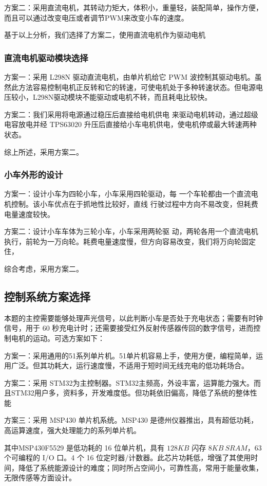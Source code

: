 \documentclass[UTF8]{ctexart}
\begin{document}
方案二：采用直流电机，其转动力矩大，体积小，重量轻，装配简单，操作方便，而且可以通过改变电压或者调节PWM来改变小车的速度。

基于以上分析，我们选择了方案二，使用直流电机作为驱动电机

\subsubsection{直流电机驱动模块选择}
方案一：采用 L298N 驱动直流电机，由单片机给它 PWM 波控制其驱动电机。虽然此方法容易控制电机正反转和它的转速，可使电机处于多种转速状态。但电源电压较小，L298N驱动模块不能驱动或电机不转，而且耗电比较快。 

方案二：我们采用将电源通过稳压后直接给电机供电 来驱动电机转动，通过超级电容放电并经 TPS63020 升压后直接给小车电机供电，使电机停或最大转速两种状态。

综上所述，采用方案二。

\subsubsection{小车外形的设计}

方案一：设计小车为四轮小车，小车采用四轮驱动，每 一个车轮都由一个直流电机控制。该小车优点在于抓地性比较好，直线 行驶过程中方向不易改变，但耗费电量速度较快。 

方案二：设计小车车体为三轮小车，小车采用两轮驱 动，两轮各用一个直流电机执行，前轮为一万向轮。耗费电量速度慢，但方向容易改变，我们将万向轮固定住，

综合考虑，采用方案二。

\subsection{控制系统方案选择}
本题的主控需要能够处理声光信号，以此判断小车是否处于充电状态；需要有时钟信号，用于 60 秒充电计时；还需要接受红外反射传感器传回的数字信号，进而控制电机的运动。可选方案如下：

方案一：采用通用的51系列单片机。51单片机容易上手，使用方便，编程简单，运用广泛。但其功耗大，运行速度慢，不适用于短时间无线充电的低功耗场合。

方案二：采用 STM32为主控制器。STM32主频高，外设丰富，运算能力强大。而且STM32用户多，资料多，开发难度低。但功耗依旧偏高，降低了系统的整体性能

方案三：采用 MSP430 单片机系统。MSP430 是德州仪器推出，具有超低功耗，高运算速度，强大处理能力的系列单片机。

其中MSP430F5529 是低功耗的 16 位单片机，具有 $ 128 KB $ 闪存 $8 KB \  SRAM $，63 个可编程的 I/O 口。4 个 16 位定时器/计数器。此芯片功耗低，增强了其使用时间，降低了系统能源设计的难度；同时所占空间小，可靠性高，常用于能量收集，无限传感等方面设计。
\end{document}

